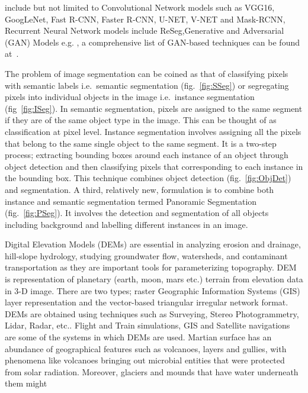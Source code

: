 \documentclass[sigconf,natbib=false]{acmart}
\begin{document}
include but not limited to Convolutional Network models such as VGG16,
GoogLeNet, Fast R-CNN, Faster R-CNN\cite{ren2016faster},
U-NET\cite{ronneberger2015unet}, V-NET\cite{milletari2016vnet} and
Mask-RCNN\cite{he2018mask}, Recurrent Neural Network models include
ReSeg\cite{visin2016reseg},Generative and Adversarial (GAN) Models e.g.
\@\cite{luc2016semantic, 8237868,hung2018adversarial}, a comprehensive list of
GAN-based techniques can be found at~\cite{ganzoo}.
\par
The problem of image segmentation can be coined as that of classifying pixels
with semantic labels i.e.~semantic segmentation (fig.~\ref{fig:SSeg}) or
segregating pixels into individual objects in the image i.e.~instance
segmentation (fig~\ref{fig:ISeg})\cite{PaneruJeelani}. In semantic segmentation,
pixels are assigned to the same segment if they are of the same object type in
the image. This can be thought of as classification at pixel level. Instance
segmentation involves assigning all the pixels that belong to the same single
object to the same segment. It is a two-step process; extracting bounding
boxes around each instance of an object through object detection and then
classifying pixels that  corresponding to each instance in the bounding box.
This technique combines object detection (fig.~\ref{fig:ObjDet}) and
segmentation. A third, relatively new, formulation is to combine both instance
and semantic segmentation termed Panoramic Segmentation (fig.~\ref{fig:PSeg}).
It involves the detection and segmentation of all objects including background
and labelling different instances in an image.\par
Digital Elevation Models (DEMs) are essential in analyzing erosion and drainage,
hill-slope hydrology, studying groundwater flow, watersheds, and contaminant
transportation as they are important tools for parameterizing topography. DEM is
representation of planetary (earth, moon, mars etc.) terrain from elevation data
in 3-D image. There are two types; raster Geographic Information Systems (GIS)
layer representation and the vector-based triangular irregular network format.
DEMs are obtained using techniques such as Surveying, Stereo Photogrammetry,
Lidar, Radar, etc.. Flight and Train simulations, GIS and Satellite navigations
are some of the systems in which DEMs are used. Martian surface has an abundance
of geographical features such as volcanoes, layers and gullies, with phenomena
like volcanoes bringing out microbial entities that were protected from solar
radiation. Moreover, glaciers and mounds that have water underneath them might
\end{document}
